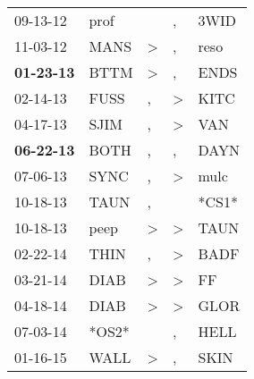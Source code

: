 \begin{supertabular}{p{0.07\textwidth}p{0.06\textwidth}p{0.02\textwidth}p{0.02\textwidth}p{0.06\textwidth}}
          09-13-12\textsuperscript{} &           prof\textsuperscript{} &                  &                , &           3WID\textsuperscript{} \\
          11-03-12\textsuperscript{} &           MANS\textsuperscript{} &     \textgreater &                , &           reso\textsuperscript{} \\
 \textbf{01-23-13\textsuperscript{}} &           BTTM\textsuperscript{} &     \textgreater &                , &           ENDS\textsuperscript{} \\
          02-14-13\textsuperscript{} &           FUSS\textsuperscript{} &                , &     \textgreater &           KITC\textsuperscript{} \\
          04-17-13\textsuperscript{} &           SJIM\textsuperscript{} &                , &     \textgreater &            VAN\textsuperscript{} \\
 \textbf{06-22-13\textsuperscript{}} &           BOTH\textsuperscript{} &                , &                , &           DAYN\textsuperscript{} \\
          07-06-13\textsuperscript{} &           SYNC\textsuperscript{} &                , &     \textgreater &           mulc\textsuperscript{} \\
          10-18-13\textsuperscript{} &           TAUN\textsuperscript{} &                , &                  &                            *CS1* \\
          10-18-13\textsuperscript{} &           peep\textsuperscript{} &     \textgreater &     \textgreater &           TAUN\textsuperscript{} \\
          02-22-14\textsuperscript{} &           THIN\textsuperscript{} &                , &     \textgreater &           BADF\textsuperscript{} \\
          03-21-14\textsuperscript{} &           DIAB\textsuperscript{} &     \textgreater &     \textgreater &             FF\textsuperscript{} \\
          04-18-14\textsuperscript{} &           DIAB\textsuperscript{} &     \textgreater &     \textgreater &           GLOR\textsuperscript{} \\
          07-03-14\textsuperscript{} &                            *OS2* &                  &                , &           HELL\textsuperscript{} \\
          01-16-15\textsuperscript{} &           WALL\textsuperscript{} &     \textgreater &                , &           SKIN\textsuperscript{} \\

\end{supertabular}
